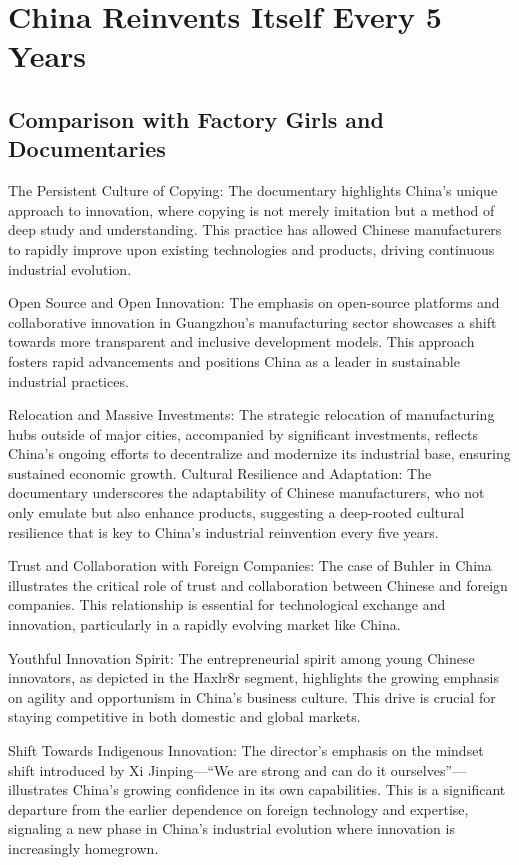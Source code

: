 \section{China Reinvents Itself Every 5 Years}

\subsection{Comparison with Factory Girls and Documentaries}

The Persistent Culture of Copying: The documentary highlights China's unique approach to innovation, where copying is not merely imitation but a method of deep study and understanding. This practice has allowed Chinese manufacturers to rapidly improve upon existing technologies and products, driving continuous industrial evolution.


Open Source and Open Innovation: The emphasis on open-source platforms and collaborative innovation in Guangzhou's manufacturing sector showcases a shift towards more transparent and inclusive development models. This approach fosters rapid advancements and positions China as a leader in sustainable industrial practices.


Relocation and Massive Investments: The strategic relocation of manufacturing hubs outside of major cities, accompanied by significant investments, reflects China's ongoing efforts to decentralize and modernize its industrial base, ensuring sustained economic growth.
Cultural Resilience and Adaptation: The documentary underscores the adaptability of Chinese manufacturers, who not only emulate but also enhance products, suggesting a deep-rooted cultural resilience that is key to China's industrial reinvention every five years.


Trust and Collaboration with Foreign Companies: The case of Buhler in China illustrates the critical role of trust and collaboration between Chinese and foreign companies. This relationship is essential for technological exchange and innovation, particularly in a rapidly evolving market like China.


Youthful Innovation Spirit: The entrepreneurial spirit among young Chinese innovators, as depicted in the Haxlr8r segment, highlights the growing emphasis on agility and opportunism in China's business culture. This drive is crucial for staying competitive in both domestic and global markets.

Shift Towards Indigenous Innovation: The director’s emphasis on the mindset shift introduced by Xi Jinping—“We are strong and can do it ourselves”—illustrates China's growing confidence in its own capabilities. This is a significant departure from the earlier dependence on foreign technology and expertise, signaling a new phase in China’s industrial evolution where innovation is increasingly homegrown.


